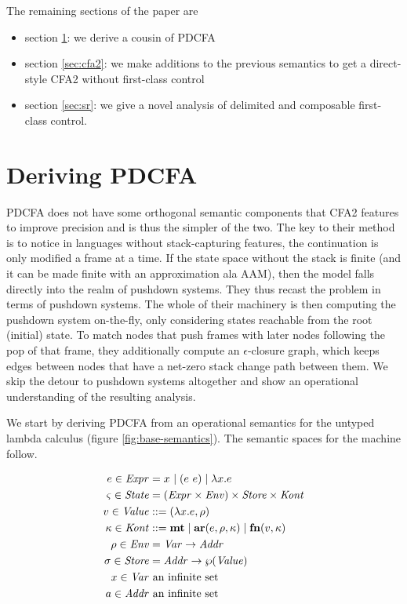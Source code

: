 \documentclass{llncs}
\begin{document}
The remaining sections of the paper are
\begin{itemize}
\item{section \ref{sec:pdcfa}: we derive a cousin of PDCFA}
\item{section \ref{sec:cfa2}: we make additions to the previous semantics to get a direct-style CFA2 without first-class control}
\item{section \ref{sec:sr}: we give a novel analysis of delimited and composable first-class control.}
\end{itemize}

\section{Deriving PDCFA}
\label{sec:pdcfa}

PDCFA does not have some orthogonal semantic components that CFA2
features to improve precision and is thus the simpler of the two. The
key to their method is to notice in languages without stack-capturing
features, the continuation is only modified a frame at a time. If the
state space without the stack is finite (and it can be made finite
with an approximation ala AAM), then the model falls directly into the
realm of pushdown systems. They thus recast the problem in terms of
pushdown systems. The whole of their machinery is then computing the
pushdown system on-the-fly, only considering states reachable from the
root (initial) state. To match nodes that push frames with later nodes
following the pop of that frame, they additionally compute an
$\epsilon$-closure graph, which keeps edges between nodes that have a
net-zero stack change path between them. We skip the detour to
pushdown systems altogether and show an operational understanding of
the resulting analysis.

We start by deriving PDCFA from an operational semantics for the
untyped lambda calculus (figure \ref{fig:base-semantics}). The
semantic spaces for the machine follow.

\begin{align*}
  e \in \mathit{Expr} &= x^{{}} \mid (e\ e){} \mid \lambda{} x. e \\
  \varsigma \in \mathit{State} &= (\mathit{Expr} \times \mathit{Env}) \times \mathit{Store} \times \mathit{Kont} \\
  v \in \mathit{Value} &::= (\lambda{} x. e, \rho) \\
  \kappa \in \mathit{Kont} &::= \mathbf{mt} \mid \mathbf{ar}{}(e,\rho,\kappa) \mid \mathbf{fn}{}(v,\kappa) \\
  \rho \in \mathit{Env} &= \mathit{Var} \to \mathit{Addr} \\
  \sigma \in \mathit{Store} &= \mathit{Addr} \to \wp(\mathit{Value}) \\
  x \in \mathit{Var} &\text{ an infinite set} \\
  a \in \mathit{Addr} &\text{ an infinite set}
\end{align*}
\end{document}
